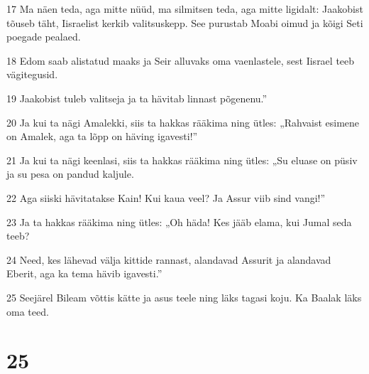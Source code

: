 \par 17 Ma näen teda, aga mitte nüüd, ma silmitsen teda, aga mitte ligidalt: Jaakobist tõuseb täht, Iisraelist kerkib valitsuskepp. See purustab Moabi oimud ja kõigi Seti poegade pealaed.
\par 18 Edom saab alistatud maaks ja Seir alluvaks oma vaenlastele, sest Iisrael teeb vägitegusid.
\par 19 Jaakobist tuleb valitseja ja ta hävitab linnast põgenenu.”
\par 20 Ja kui ta nägi Amalekki, siis ta hakkas rääkima ning ütles: „Rahvaist esimene on Amalek, aga ta lõpp on häving igavesti!”
\par 21 Ja kui ta nägi keenlasi, siis ta hakkas rääkima ning ütles: „Su eluase on püsiv ja su pesa on pandud kaljule.
\par 22 Aga siiski hävitatakse Kain! Kui kaua veel? Ja Assur viib sind vangi!”
\par 23 Ja ta hakkas rääkima ning ütles: „Oh häda! Kes jääb elama, kui Jumal seda teeb?
\par 24 Need, kes lähevad välja kittide rannast, alandavad Assurit ja alandavad Eberit, aga ka tema hävib igavesti.”
\par 25 Seejärel Bileam võttis kätte ja asus teele ning läks tagasi koju. Ka Baalak läks oma teed.

\chapter{25}

